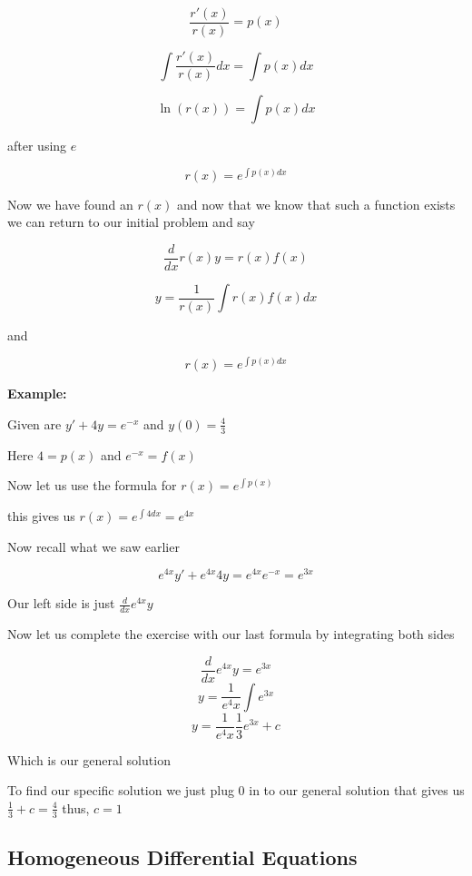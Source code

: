\[
    \frac{r'(x)}{r(x)} = p(x)
\]

\[
    \int \frac{r'(x)}{r(x)}dx = \int p(x)dx
\]

\[
    \ln(r(x)) = \int p(x) dx
\]

after using \(e\)

\[ 
    r(x) = e^{\int p(x) dx}
\]

Now we have found an \(r(x)\) and now that we know that such a function exists we can return 
to our initial problem and say

\[
    \frac{d}{dx}r(x)y = r(x)f(x)
\]

\[
    y = \frac{1}{r (x) } \int r (x) f (x) dx
\]

and 

\[
    r(x) = e^{\int p (x) dx}
\]

\textbf{Example:}
\vspace{\baselineskip}


Given are \(y' + 4y = e^{-x}\) and \(y(0) = \frac{4}{3}\)
\vspace{\baselineskip}

Here \(4 = p(x)\) and \(e^{-x} = f(x)\)
\vspace{\baselineskip}

Now let us use the formula for \(r(x) = e^{\int p (x)}\)
\vspace{\baselineskip}

this gives us \(r(x) = e^{\int 4dx} = e^{4x}\)
\vspace{\baselineskip}

Now recall what we saw earlier

\[
    e^{4x}y' + e^{4x}4y = e^{4x}e^{-x} = e^{3x}
\]

Our left side is just \(\frac{d}{dx} e^{4x}y\)
\vspace{\baselineskip}

Now let us complete the exercise with our last formula by integrating both sides

\[
    \frac{d}{dx} e^{4x}y = e^{3x}
\]
\[
    y = \frac{1}{e^4x}\int e^{3x}
\]
\[
    y = \frac{1}{e^4x} \frac{1}{3}e^{3x} + c
\]

Which is our general solution
\vspace{\baselineskip}

To find our specific solution we just plug 0 in to our general solution that gives us
\(\frac{1}{3} + c = \frac{4}{3}\) thus, \(c = 1\)

\subsection{Homogeneous Differential Equations}


